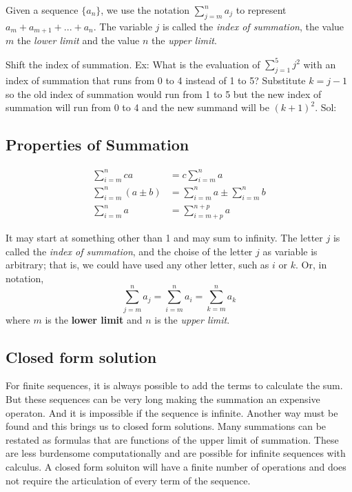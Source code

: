 \begin{definition} [Summation] 
Given a sequence $\{a_n\}$, we use the notation $\sum_{j=m}^{n} a_j $ to represent $a_m + a_{m+1}+ ... + a_n$. The variable $j$ is called the \textit{index of summation}, the value $m$ the  \textit{lower limit} and the value $n$ the \textit{upper limit}. 
\end{definition}

Shift the index of summation. 
Ex: What is the evaluation of $\sum_{j=1}^5 j^2$ with an index of summation that runs from 0 to 4 instead of 1 to 5? Substitute $k=j-1$ so the old index of summation would run from 1 to 5 but the new index of summation will run from  0 to 4 and the new summand will be $(k+1)^2$.
Sol: 

\subsection{Properties of Summation}

\begin{align}
\sum_{i=m}^n ca &=  c \sum_{i=m}^n a\\
\sum_{i=m}^n (a \pm b) &= \sum_{i=m}^n a \pm  \sum_{i=m}^n b \\
\sum_{i=m}^n a &= \sum_{i=m+p}^{n+p} a
\end{align}



It may start at something other than 1 and may sum to infinity. The letter $j$ is called the \textit{index of summation}, and the choise of the letter $j$ as variable is arbitrary; that is, we could have used any other letter, such as $i$ or $k$. Or, in notation, 
$$\sum_{j=m}^n a_j = \sum_{i=m}^n a_i = \sum _{k=m}^n a_k$$
where $m$ is the \textbf{lower limit} and $n$ is the \textit{upper limit}.

\subsection{Closed form solution}
For finite sequences, it is always possible to add the terms to calculate the sum. But these sequences can be very long making the summation an expensive operaton. And it is impossible if the sequence is infinite. Another way must be found and this brings us to closed form solutions. Many summations can be restated as formulas that are functions of the upper limit of summation. These are less burdensome computationally and are possible for infinite sequences with calculus.  
A closed form soluiton will have a finite number of operations and does not require the articulation of every term of the sequence.

